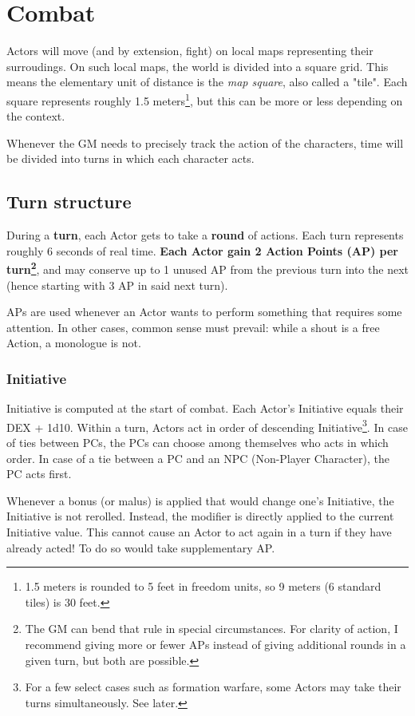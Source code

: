 \chapter{Combat}

Actors will move (and by extension, fight) on local maps representing their surroudings. On such local maps, the world is divided into a square grid. This means the elementary unit of distance is the \textit{map square}, also called a "tile". Each square represents roughly 1.5 meters\footnote{1.5 meters is rounded to 5 feet in freedom units, so 9 meters (6 standard tiles) is 30 feet.}, but this can be more or less depending on the context. 

Whenever the GM needs to precisely track the action of the characters, time will be divided into turns in which each character acts. 

\section{Turn structure}

During a \textbf{turn}, each Actor gets to take a \textbf{round} of actions. Each turn represents roughly 6 seconds of real time. \textbf{Each Actor gain 2 Action Points (AP) per turn\footnote{The GM can bend that rule in special circumstances. For clarity of action, I recommend giving more or fewer APs instead of giving additional rounds in a given turn, but both are possible.}}, and may conserve up to 1 unused AP from the previous turn into the next (hence starting with 3 AP in said next turn). 

APs are used whenever an Actor wants to perform something that requires some attention. In other cases, common sense must prevail: while a shout is a free Action, a monologue is not.

\subsection{Initiative} 

Initiative is computed at the start of combat. Each Actor's Initiative equals their DEX + 1d10. Within a turn, Actors act in order of descending Initiative\footnote{For a few select cases such as formation warfare, some Actors may take their turns simultaneously. See later.}. In case of ties between PCs, the PCs can choose among themselves who acts in which order. In case of a tie between a PC and an NPC (Non-Player Character), the PC acts first.

Whenever a bonus (or malus) is applied that would change one's Initiative, the Initiative is not rerolled. Instead, the modifier is directly applied to the current Initiative value. This cannot cause an Actor to act again in a turn if they have already acted! To do so would take supplementary AP.



